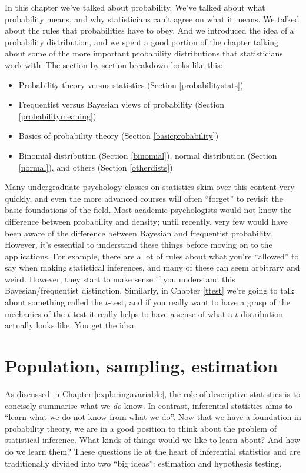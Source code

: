 \documentclass[
  11pt,
  a4paper,
  twoside,symmetric,openright]{book}
\providecommand{\tightlist}{%
  \setlength{\itemsep}{0pt}\setlength{\parskip}{0pt}}
\theoremstyle{break}
\theoremstyle{break}
\begin{document}
In this chapter we've talked about probability. We've talked about what probability means, and why statisticians can't agree on what it means. We talked about the rules that probabilities have to obey. And we introduced the idea of a probability distribution, and we spent a good portion of the chapter talking about some of the more important probability distributions that statisticians work with. The section by section breakdown looks like this:

\begin{itemize}
\tightlist
\item
  Probability theory versus statistics (Section \ref{probabilitystats})
\item
  Frequentist versus Bayesian views of probability (Section \ref{probabilitymeaning})
\item
  Basics of probability theory (Section \ref{basicprobability})
\item
  Binomial distribution (Section \ref{binomial}), normal distribution (Section \ref{normal}), and others (Section \ref{otherdists})
\end{itemize}

Many undergraduate psychology classes on statistics skim over this content very quickly, and even the more advanced courses will often ``forget'' to revisit the basic foundations of the field. Most academic psychologists would not know the difference between probability and density; until recently, very few would have been aware of the difference between Bayesian and frequentist probability. However, it's essential to understand these things before moving on to the applications. For example, there are a lot of rules about what you're ``allowed'' to say when making statistical inferences, and many of these can seem arbitrary and weird. However, they start to make sense if you understand this Bayesian/frequentist distinction. Similarly, in Chapter \ref{ttest} we're going to talk about something called the \(t\)-test, and if you really want to have a grasp of the mechanics of the \(t\)-test it really helps to have a sense of what a \(t\)-distribution actually looks like. You get the idea.

\chapter{Population, sampling, estimation}\label{estimation}

As discussed in Chapter \ref{exploringavariable}, the role of descriptive statistics is to concisely summarise what we \emph{do} know. In contrast, inferential statistics aims to ``learn what we do not know from what we do''. Now that we have a foundation in probability theory, we are in a good position to think about the problem of statistical inference. What kinds of things would we like to learn about? And how do we learn them? These questions lie at the heart of inferential statistics and are traditionally divided into two ``big ideas'': estimation and hypothesis testing.
\end{document}
